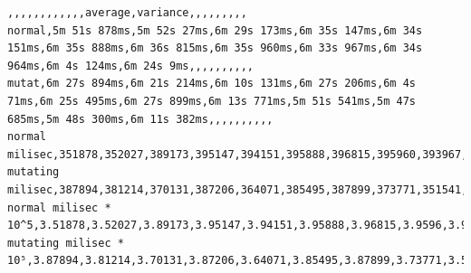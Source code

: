 \documentclass[
]{article}
\begin{document}
\begin{verbatim}
,,,,,,,,,,,,average,variance,,,,,,,,,
normal,5m 51s 878ms,5m 52s 27ms,6m 29s 173ms,6m 35s 147ms,6m 34s 151ms,6m 35s 888ms,6m 36s 815ms,6m 35s 960ms,6m 33s 967ms,6m 34s 964ms,6m 4s 124ms,6m 24s 9ms,,,,,,,,,,
mutat,6m 27s 894ms,6m 21s 214ms,6m 10s 131ms,6m 27s 206ms,6m 4s 71ms,6m 25s 495ms,6m 27s 899ms,6m 13s 771ms,5m 51s 541ms,5m 47s 685ms,5m 48s 300ms,6m 11s 382ms,,,,,,,,,,
normal milisec,351878,352027,389173,395147,394151,395888,396815,395960,393967,394964,364124,384008.545454545,337134927.872727,,,,,,,,,
mutating milisec,387894,381214,370131,387206,364071,385495,387899,373771,351541,347685,348300,371382.454545455,264041625.672727,,,,,,,,,
normal milisec * 10^5,3.51878,3.52027,3.89173,3.95147,3.94151,3.95888,3.96815,3.9596,3.93967,3.94964,3.64124,3.84008545454545,0.0337134927872727,,,,,,,,,
mutating milisec * 10⁵,3.87894,3.81214,3.70131,3.87206,3.64071,3.85495,3.87899,3.73771,3.51541,3.47685,3.483,3.71382454545455,0.0264041625672727,,,,,,,,,
\end{verbatim}
\end{document}
